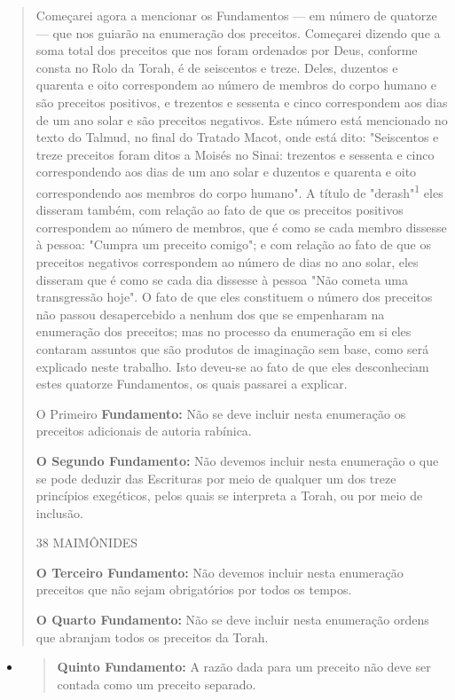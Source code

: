 \begin{quote}
Começarei agora a mencionar os Fundamentos --- em número de qua­torze
--- que nos guiarão na enumeração dos preceitos. Começarei dizendo que a
soma total dos preceitos que nos foram ordenados por Deus, conforme
cons­ta no Rolo da Torah, é de seiscentos e treze. Deles, duzentos e
quarenta e oito correspondem ao número de membros do corpo humano e são
preceitos posi­tivos, e trezentos e sessenta e cinco correspondem aos
dias de um ano solar e são preceitos negativos. Este número está
mencionado no texto do Talmud, no final do Tratado Macot, onde está
dito: "Seiscentos e treze preceitos foram ditos a Moisés no Sinai:
trezentos e sessenta e cinco correspondendo aos dias de um ano solar e
duzentos e quarenta e oito correspondendo aos membros do corpo humano".
A título de "derash"\textsuperscript{1} eles disseram também, com
relação ao fato de que os preceitos positivos correspondem ao número de
membros, que é como se cada membro dissesse à pessoa: "Cumpra um
preceito comi­go"; e com relação ao fato de que os preceitos negativos
correspondem ao nú­mero de dias no ano solar, eles disseram que é como
se cada dia dissesse à pes­soa "Não cometa uma transgressão hoje". O
fato de que eles constituem o nú­mero dos preceitos não passou
desapercebido a nenhum dos que se empenha­ram na enumeração dos
preceitos; mas no processo da enumeração em si eles contaram assuntos
que são produtos de imaginação sem base, como será expli­cado neste
trabalho. Isto deveu-se ao fato de que eles desconheciam estes qua­torze
Fundamentos, os quais passarei a explicar.

O Primeiro \textbf{Fundamento:} Não se deve incluir nesta enumeração os
preceitos adicionais de autoria rabínica.

\textbf{O Segundo Fundamento:} Não devemos incluir nesta enumeração o
que se po­de deduzir das Escrituras por meio de qualquer um dos treze
princípios exegé­ticos, pelos quais se interpreta a Torah, ou por meio
de inclusão.

38 MAIMÔNIDES

\textbf{O Terceiro Fundamento:} Não devemos incluir nesta enumeração
preceitos que não sejam obrigatórios por todos os tempos.

\textbf{O Quarto Fundamento:} Não se deve incluir nesta enumeração
ordens que abran­jam todos os preceitos da Torah.
\end{quote}

\begin{itemize}
\item
  \begin{quote}
  \textbf{Quinto Fundamento:} A razão dada para um preceito não deve ser
  contada como um preceito separado.
  \end{quote}
\end{itemize}

